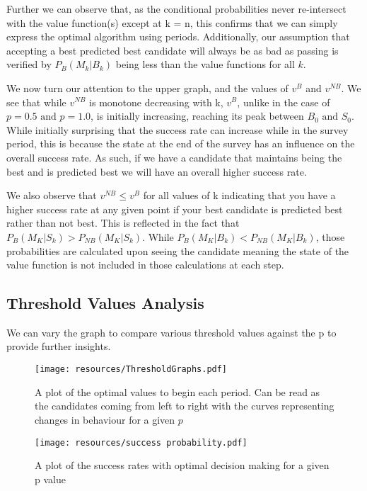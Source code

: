 \documentclass[a4paper,11pt]{article}
\begin{document}
Further we can observe that, as the conditional probabilities never re-intersect with the value function(s) except at k = n, this confirms that we can simply express the optimal algorithm using periods. Additionally, our assumption that accepting a best predicted best candidate will always be as bad as passing is verified by $P_B(M_k|B_k)$ being less than the value functions for all $k$.

We now turn our attention to the upper graph, and the values of $v^{B}$ and $v^{NB}$. We see that while $v^{NB}$ is monotone decreasing with k, $v^B$, unlike in the case of $p=0.5 \text{ and }  p = 1.0$, is initially increasing, reaching its peak between $B_0 \text{ and } S_0$. While initially surprising that the success rate can increase while in the survey period, this is because the state at the end of the survey has an influence on the overall success rate. As such, if we have a candidate that maintains being the best and is predicted best we will have an overall higher success rate.

We also observe that $v^{NB} \le v^B$ for all values of k indicating that you have a higher success rate at any given point if your best candidate is predicted best rather than not best. This is reflected in the fact that $P_B(M_K|S_k) > P_{NB}(M_K|S_k)$. While $P_B(M_K|B_k) < P_{NB}(M_K|B_k)$, those probabilities are calculated upon seeing the candidate meaning the state of the value function is not included in those calculations at each step.

\subsection{Threshold Values Analysis}

We can vary the graph to compare various threshold values against the p to provide further insights. 

\begin{figure}[H]
    \centering
    \texttt{[image: resources/ThresholdGraphs.pdf]}
    \caption{A plot of the optimal values to begin each period. Can be read as the candidates coming from left to right with the curves representing changes in behaviour for a given $p$}
    \label{fig:thresholdgraph}
\end{figure}

\begin{figure}[H]
    \centering
    \texttt{[image: resources/success probability.pdf]}
    \caption{A plot of the success rates with optimal decision making for a given p value}
    \label{fig:successGraph}
\end{figure}
\end{document}
